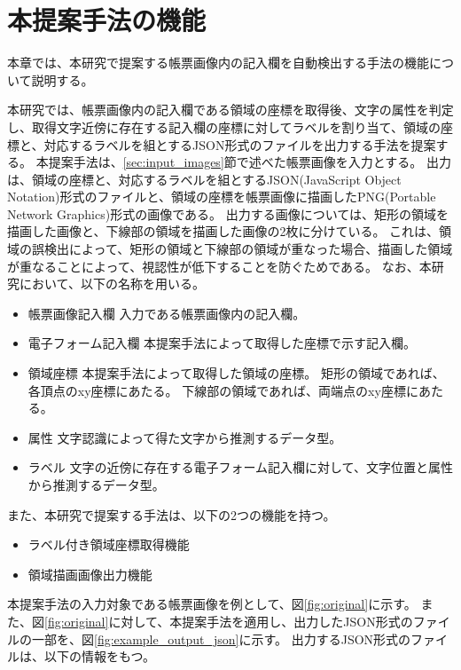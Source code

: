 \chapter{本提案手法の機能}\label{cha:Function}
本章では、本研究で提案する帳票画像内の記入欄を自動検出する手法の機能について説明する。

本研究では、帳票画像内の記入欄である領域の座標を取得後、文字の属性を判定し、取得文字近傍に存在する記入欄の座標に対してラベルを割り当て、領域の座標と、対応するラベルを組とするJSON形式のファイルを出力する手法を提案する。
本提案手法は、\ref{sec:input_images}節で述べた帳票画像を入力とする。
出力は、領域の座標と、対応するラベルを組とするJSON(JavaScript Object Notation)形式のファイルと、領域の座標を帳票画像に描画したPNG(Portable Network Graphics)形式の画像である。
出力する画像については、矩形の領域を描画した画像と、下線部の領域を描画した画像の2枚に分けている。
これは、領域の誤検出によって、矩形の領域と下線部の領域が重なった場合、描画した領域が重なることによって、視認性が低下することを防ぐためである。
なお、本研究において、以下の名称を用いる。

\begin{itemize}
    \item 帳票画像記入欄
          入力である帳票画像内の記入欄。
    \item 電子フォーム記入欄
          本提案手法によって取得した座標で示す記入欄。
    \item 領域座標
          本提案手法によって取得した領域の座標。
          矩形の領域であれば、各頂点のxy座標にあたる。
          下線部の領域であれば、両端点のxy座標にあたる。
    \item 属性
          文字認識によって得た文字から推測するデータ型。
    \item ラベル
          文字の近傍に存在する電子フォーム記入欄に対して、文字位置と属性から推測するデータ型。
\end{itemize}

また、本研究で提案する手法は、以下の2つの機能を持つ。

\begin{itemize}
    \item ラベル付き領域座標取得機能
    \item 領域描画画像出力機能
\end{itemize}

本提案手法の入力対象である帳票画像を例として、図\ref{fig:original}に示す。
また、図\ref{fig:original}に対して、本提案手法を適用し、出力したJSON形式のファイルの一部を、図\ref{fig:example_output_json}に示す。
出力するJSON形式のファイルは、以下の情報をもつ。

